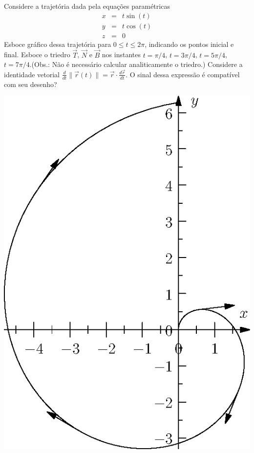 \begin{exer} Considere a trajetória dada pela equações paramétricas
\begin{eqnarray*}
x&=&t\sin (t)\\
y&=&t\cos (t)\\
z&=&0
\end{eqnarray*}
Esboce gráfico dessa trajetória para $0\leq t \leq 2\pi$, indicando os pontos inicial e final. Esboce o triedro $\vec{T}$, $\vec{N}$ e $\vec{B}$ nos instantes $t=\pi/4$, $t=3\pi/4$, $t=5\pi/4$, $t=7\pi/4$.(Obs.: Não é necessário calcular analiticamente o triedro.) Considere a identidade vetorial $\frac{d}{dt}\|\vec{r}(t)\|=\vec{r}\cdot\frac{d\vec{r}}{dt}$. O sinal dessa expressão é compatível com seu desenho?
\end{exer}
\begin{resp}
 \includegraphics{./cap_curvas/figs/espiral}
\end{resp}

